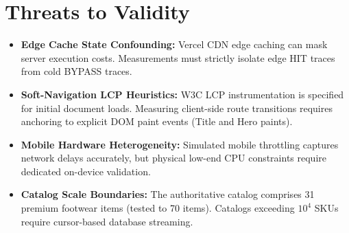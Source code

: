 \documentclass[conference]{IEEEtran}
\begin{document}
\section{Threats to Validity}
\begin{itemize}
    \item \textbf{Edge Cache State Confounding:} Vercel CDN edge caching can mask server execution costs. Measurements must strictly isolate edge HIT traces from cold BYPASS traces.
    \item \textbf{Soft-Navigation LCP Heuristics:} W3C LCP instrumentation is specified for initial document loads. Measuring client-side route transitions requires anchoring to explicit DOM paint events (Title and Hero paints).
    \item \textbf{Mobile Hardware Heterogeneity:} Simulated mobile throttling captures network delays accurately, but physical low-end CPU constraints require dedicated on-device validation.
    \item \textbf{Catalog Scale Boundaries:} The authoritative catalog comprises 31 premium footwear items (tested to 70 items). Catalogs exceeding $10^4$ SKUs require cursor-based database streaming.
\end{itemize}
\end{document}
